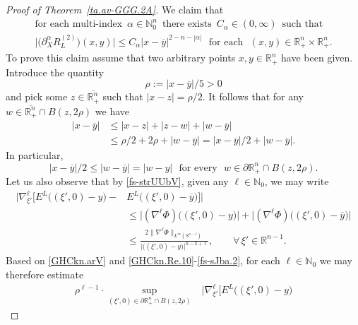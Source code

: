 \documentclass[11pt,reqno]{amsart}
\numberwithin{equation}{section}
\theoremstyle{remark}
\begin{document}
\begin{proof}[Proof of Theorem~\ref{ta.av-GGG.2A}]
We claim that  
%
\begin{equation}\label{eq1.20}
\begin{array}{c}
\text{for each multi-index }\,\alpha\in\mathbb{N}_0^n\,\text{ there exists }
\,C_\alpha\in(0,\infty)\,\text{ such that}
\\[4pt]
\big|\big(\partial^\alpha_X R^{(2)}_L\big)(x,y)\big|
\leq C_\alpha|x-\overline{y}|^{2-n-|\alpha|}\,\,\text{ for each }\,\,
(x,y)\in{\mathbb{R}}^n_{+}\times{\mathbb{R}}^n_{+}.
\end{array}
\end{equation}
%
To prove this claim assume that two arbitrary points $x,y\in{\mathbb{R}}^n_+$ have been given. 
Introduce the quantity 
%
\begin{equation}\label{GHCkn.arV}
\rho:=|x-\overline{y}|/5>0 
\end{equation}
%
and pick some $z\in\overline{{\mathbb{R}}^n_{+}}$ such that $|x-z|=\rho/2$. 
It follows that for any $w\in\overline{\mathbb{R}^n_{+}}\cap B(z,2\rho)$ we have
%
\begin{align}\label{GHCkn.Re.9}
|x-\overline{y}| &\leq |x-z|+|z-w|+|w-\overline{y}|
\nonumber\\[4pt]
&\leq\rho/2+2\rho+|w-\overline{y}|=|x-\overline{y}|/2+|w-\overline{y}|.
\end{align}
%
In particular, 
%
\begin{equation}\label{GHCkn.Re.10}
|x-\overline{y}|/2\leq |w-\overline{y}|=|w-y|\,\,\text{ for every }\,\,
w\in\partial{\mathbb{R}}^n_+\cap B(z,2\rho). 
\end{equation}
%
Let us also observe that by \eqref{fs-strUUbV}, given any $\ell\in\mathbb{N}_0$, we may write 
%
\begin{align}\label{fs-sJba.2}
\big|\nabla^\ell_{\xi'}\big[E^L\big((\xi',0)-y\big)
-& E^L\big((\xi',0)-\overline{y}\big)\big]\big|
\nonumber\\[4pt]
& \leq\big|(\nabla^\ell\Phi)\big((\xi',0)-y\big)\big|
+\big|(\nabla^\ell\Phi)\big((\xi',0)-\overline{y}\big)\big|
\nonumber\\[4pt]
& \leq\frac{2\|\nabla^\ell\Phi\|_{L^\infty(S^{n-1})}}
{\big|\big((\xi',0)-y\big)\big|^{n-2+\ell}},
\qquad\forall\,\xi'\in{\mathbb{R}}^{n-1}.
\end{align}
%
Based on \eqref{GHCkn.arV} and \eqref{GHCkn.Re.10}-\eqref{fs-sJba.2}, for each $\ell\in\mathbb{N}_0$
we may therefore estimate 
%
\begin{align}\label{nablaPhi}
\rho^{\ell-1}\cdot\sup_{(\xi',0)\in\partial\mathbb{R}^n_{+}\cap B(z,2\rho)} &
\big|\nabla^\ell_{\xi'}\big[E^L\big((\xi',0)-y\big)

\end{align}
\end{proof}
\end{document}
